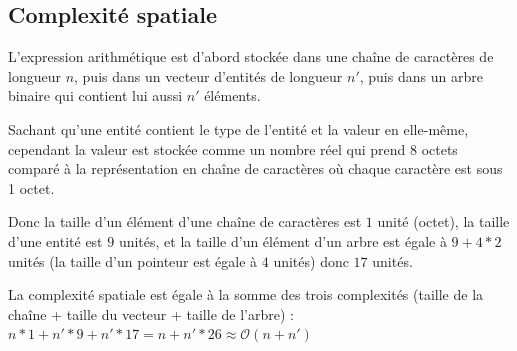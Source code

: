 \subsection{Complexité spatiale}
L'expression arithmétique est d'abord stockée dans une chaîne de caractères de longueur $n$, puis dans un vecteur d'entités de longueur $n'$, puis dans un arbre binaire qui contient lui aussi $n'$ éléments.
\par
Sachant qu'une entité contient le type de l'entité et la valeur en elle-même, cependant la valeur est stockée comme un nombre réel qui prend 8 octets comparé à la représentation en chaîne de caractères où chaque caractère est sous 1 octet.
\par
Donc la taille d'un élément d'une chaîne de caractères est $1$ unité (octet), la taille d'une entité est $9$ unités, et la taille d'un élément d'un arbre est égale à $9 + 4 * 2$ unités (la taille d'un pointeur est égale à $4$ unités) donc $17$ unités.
\par
La complexité spatiale est égale à la somme des trois complexités (taille de la chaîne + taille du vecteur + taille de l'arbre) : $n * 1 + n' * 9 + n' * 17 = n + n' * 26 \approx \mathcal{O}(n + n')$
\par

